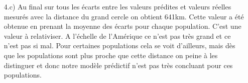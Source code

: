 \documentclass[a4paper, 12pt]{article}
\begin{document}
\begin{enumerate}
\item[4.c)]
Au final sur tous les écarts entre les valeurs prédites et valeurs réelles mesurés avec la distance du grand cercle on obtient 641km. Cette valeur a été obtenue en prenant la moyenne des écarts pour chaque population. C'est une valeur à relativiser. A l'échelle de l'Amérique ce n'est pas très grand et ce n'est pas si mal. Pour certaines populations cela se voit d'ailleurs, mais dès que les populations sont plus proche que cette distance on peine à les distinguer et donc notre modèle prédictif n'est pas très concluant pour ces populations.

\end{enumerate}
\end{document}
